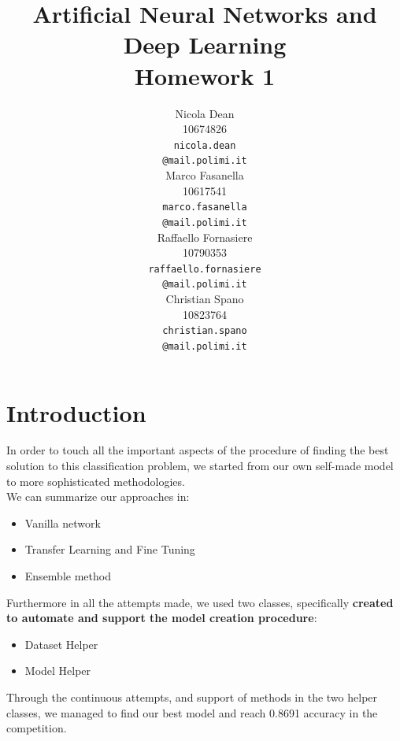 \documentclass[10pt]{article}
\title{Artificial Neural Networks and Deep Learning \\
Homework 1}
\author{
  Nicola Dean \\
  10674826 \\
  {\tt nicola.dean \\
  \tt @mail.polimi.it} \\\And
  Marco Fasanella \\
  10617541 \\
  {\tt marco.fasanella \\
  \tt @mail.polimi.it} \\\And
  Raffaello Fornasiere \\
    10790353 \\
    {\tt raffaello.fornasiere \\
    \tt @mail.polimi.it} \\\And
  Christian Spano \\
  10823764 \\
  {\tt christian.spano \\
  \tt @mail.polimi.it} \\}
\date{}
\begin{document}
\maketitle



\section{Introduction}
In order to touch all the important aspects of the procedure of finding the best solution to this classification problem,
we started from our own self-made model to more sophisticated methodologies.\\
 We can summarize our approaches in:
\begin{itemize}
  \item Vanilla network
  \item Transfer Learning and Fine Tuning
  \item Ensemble method
\end{itemize}
Furthermore in all the attempts made, we used two classes, specifically \textbf{created to automate and support the model creation
procedure}:
\begin{itemize}
  \item Dataset Helper
  \item Model Helper
\end{itemize}
Through the continuous attempts, and support of methods in the two helper classes, we managed to find our best model and
reach 0.8691 accuracy in the competition.
\end{document}

